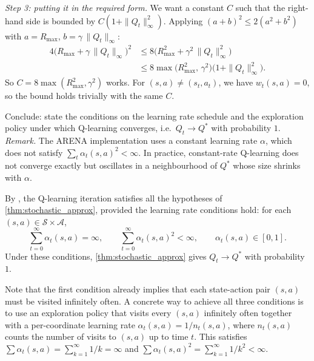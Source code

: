 \documentclass[11pt]{article}
\newcommand{\cS}{\mathcal{S}}
\newcommand{\cA}{\mathcal{A}}
\begin{document}
\begin{solution}
\emph{Step 3: putting it in the required form.} We want a constant $C$ such that the right-hand side is bounded by $C(1 + \|Q_t\|_\infty^2)$. Applying $(a+b)^2 \le 2(a^2 + b^2)$ with $a = R_{\max}$, $b = \gamma\,\|Q_t\|_\infty$:
\begin{align*}
4\bigl(R_{\max} + \gamma\,\|Q_t\|_\infty\bigr)^2
&\le 8\bigl(R_{\max}^2 + \gamma^2\,\|Q_t\|_\infty^2\bigr) \\
&\le 8\max\!\bigl(R_{\max}^2,\, \gamma^2\bigr)\bigl(1 + \|Q_t\|_\infty^2\bigr).
\end{align*}
So $C = 8\max(R_{\max}^2, \gamma^2)$ works. For $(s,a) \neq (s_t, a_t)$, we have $w_t(s,a) = 0$, so the bound holds trivially with the same $C$.
\end{solution}

\begin{exercise}
\label{prob:q_learning_converge} Conclude: state the conditions on the learning rate schedule and the exploration policy under which Q-learning converges, i.e.\ $Q_t \to Q^*$ with probability $1$.
\emph{Remark.} The ARENA implementation uses a constant learning rate $\alpha$, which does not satisfy $\sum_t \alpha_t(s,a)^2 < \infty$. In practice, constant-rate Q-learning does not converge exactly but oscillates in a neighbourhood of $Q^*$ whose size shrinks with $\alpha$.
\end{exercise}

\begin{solution}
By , the Q-learning iteration satisfies all the hypotheses of \cref{thm:stochastic_approx}, provided the learning rate conditions hold: for each $(s,a) \in \cS \times \cA$,
$$
\sum_{t=0}^{\infty} \alpha_t(s,a) = \infty, \qquad \sum_{t=0}^{\infty} \alpha_t(s,a)^2 < \infty, \qquad \alpha_t(s,a) \in [0,1].
$$
Under these conditions, \cref{thm:stochastic_approx} gives $Q_t \to Q^*$ with probability $1$.

Note that the first condition already implies that each state-action pair $(s,a)$ must be visited infinitely often. A concrete way to achieve all three conditions is to use an exploration policy that visits every $(s,a)$ infinitely often together with a per-coordinate learning rate $\alpha_t(s,a) = 1/n_t(s,a)$, where $n_t(s,a)$ counts the number of visits to $(s,a)$ up to time $t$. This satisfies $\sum \alpha_t(s,a) = \sum_{k=1}^\infty 1/k = \infty$ and $\sum \alpha_t(s,a)^2 = \sum_{k=1}^\infty 1/k^2 < \infty$.
\end{solution}
\end{document}
